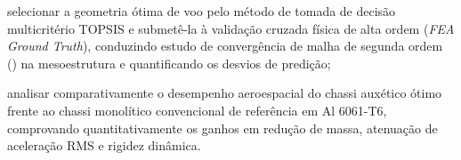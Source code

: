 \begin{alineas}
  \item selecionar a geometria ótima de voo pelo método de tomada de decisão multicritério TOPSIS e submetê-la à validação cruzada física de alta ordem (\textit{FEA Ground Truth}), conduzindo estudo de convergência de malha de segunda ordem () na mesoestrutura e quantificando os desvios de predição;
  \item analisar comparativamente o desempenho aeroespacial do chassi auxético ótimo frente ao chassi monolítico convencional de referência em Al 6061-T6, comprovando quantitativamente os ganhos em redução de massa, atenuação de aceleração RMS e rigidez dinâmica.
\end{alineas}
